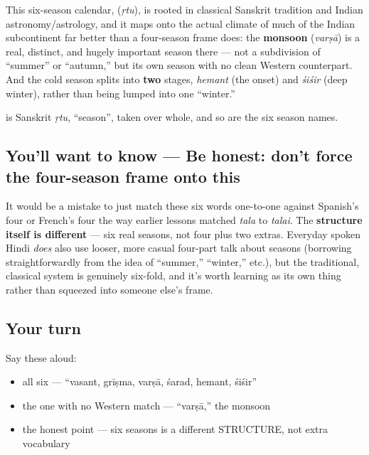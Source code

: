 This six-season calendar, \textbf{} (\emph{ṛtu}), is rooted in classical Sanskrit tradition and Indian astronomy/astrology, and it maps onto the actual climate of much of the Indian subcontinent far better than a four-season frame does: the \textbf{monsoon} (\emph{varṣā}) is a real, distinct, and hugely important season there — not a subdivision of \textquotedblleft{}summer\textquotedblright{} or \textquotedblleft{}autumn,\textquotedblright{} but its own season with no clean Western counterpart. And the cold season splits into \textbf{two} stages, \emph{hemant} (the onset) and \emph{śiśir} (deep winter), rather than being lumped into one \textquotedblleft{}winter.\textquotedblright{}

\textbf{} is Sanskrit \emph{ṛtu}, \textquotedblleft{}season\textquotedblright{}, taken over whole, and so are the six season names.

\subsection*{You'll want to know — Be honest: don't force the four-season frame onto this}
It would be a mistake to just match these six words one-to-one against Spanish's four or French's four the way earlier lessons matched \emph{tala} to \emph{talai}. The \textbf{structure itself is different} — six real seasons, not four plus two extras. Everyday spoken Hindi \emph{does} also use looser, more casual four-part talk about seasons (borrowing straightforwardly from the idea of \textquotedblleft{}summer,\textquotedblright{} \textquotedblleft{}winter,\textquotedblright{} etc.), but the traditional, classical  system is genuinely six-fold, and it's worth learning as its own thing rather than squeezed into someone else's frame.

\subsection*{Your turn}
Say these aloud:

\begin{itemize}
\raggedright
  \item all six — \textquotedblleft{}vasant, grīṣma, varṣā, śarad, hemant, śiśir\textquotedblright{}
  \item the one with no Western match — \textquotedblleft{}varṣā,\textquotedblright{} the monsoon
  \item the honest point — six seasons is a different STRUCTURE, not extra vocabulary
\end{itemize}

